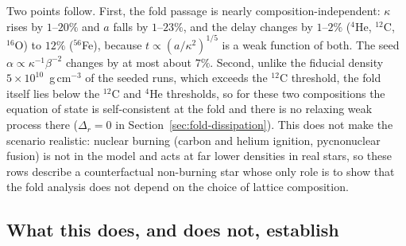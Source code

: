 \documentclass[11pt]{article}
\begin{document}
Two points follow. First, the fold passage is nearly composition-independent: $\kappa$ rises by $1$--$20\%$ and $a$ falls by $1$--$23\%$, and the delay changes by $1$--$2\%$ ($^{4}$He, $^{12}$C, $^{16}$O) to $12\%$ ($^{56}$Fe), because $t\propto(a/\kappa^2)^{1/5}$ is a weak function of both. The seed $\alpha\propto\kappa^{-1}\beta^{-2}$ changes by at most about $7\%$. Second, unlike the fiducial density $5\times10^{10}$~g\,cm$^{-3}$ of the seeded runs, which exceeds the $^{12}$C threshold, the fold itself lies below the $^{12}$C and $^{4}$He thresholds, so for these two compositions the equation of state is self-consistent at the fold and there is no relaxing weak process there ($\Delta_r=0$ in Section~\ref{sec:fold-dissipation}). This does not make the scenario realistic: nuclear burning (carbon and helium ignition, pycnonuclear fusion) is not in the model and acts at far lower densities in real stars, so these rows describe a counterfactual non-burning star whose only role is to show that the fold analysis does not depend on the choice of lattice composition.

\subsection{What this does, and does not, establish}
\label{sec:timescale-honest}
\end{document}
